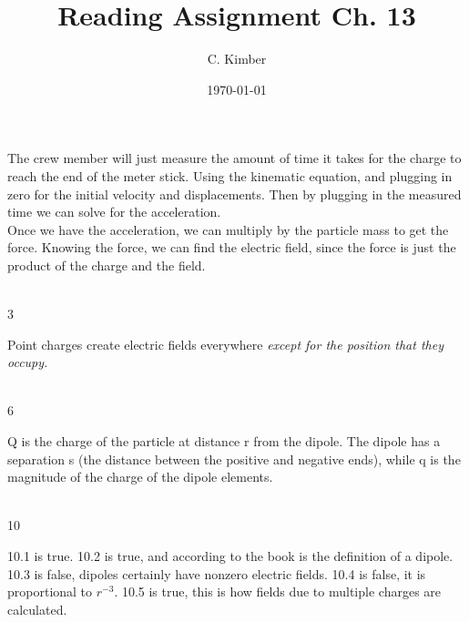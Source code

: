 \documentclass[a4paper,11pt]{article}
\begin{document}
\title{Reading Assignment Ch. 13}
\date{\today}
\author{C. Kimber}
\maketitle
\newpage

\begin{center}
The crew member will just measure the amount of time it takes for the charge
to reach the end of the meter stick. Using the kinematic equation, and plugging
in zero for the initial velocity and displacements. Then by plugging in the measured time
we can solve for the acceleration.
\\
Once we have the acceleration, we can multiply by the particle mass to get the force.
Knowing the force, we can find the electric field, since the force is just
the product of the charge and the field.
\end{center}
\\

3
\begin{center}
Point charges create electric fields everywhere \it{except for the position that they
occupy.}
\end{center}

\\
6
\begin{center}
Q is the charge of the particle at distance r from the dipole. The dipole has a separation
s (the distance between the positive and negative ends), while q is the magnitude of the
charge of the dipole elements.
\end{center}

\\
10
\begin{center}
10.1 is true. 10.2 is true, and according to the book is the definition of a dipole. 10.3 is
false, dipoles certainly have nonzero electric fields. 10.4 is false, it is proportional to $r^{-3}$.
10.5 is true, this is how fields due to multiple charges are calculated.
\end{center}
\end{document}
